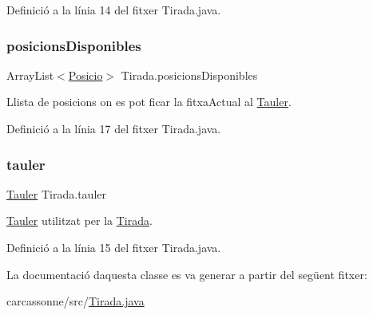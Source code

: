 Definició a la línia 14 del fitxer Tirada.\+java.

\mbox{\label{class_tirada_aaccd3106612026e374b9c2cb769aca12}} 
\subsubsection{\texorpdfstring{posicions\+Disponibles}{posicionsDisponibles}}
{\footnotesize\ttfamily Array\+List$<$\mbox{\hyperlink{class_posicio}{Posicio}}$>$ Tirada.\+posicions\+Disponibles\hspace{0.3cm}{\ttfamily [private]}}



Llista de posicions on es pot ficar la fitxa\+Actual al \mbox{\hyperlink{class_tauler}{Tauler}}. 



Definició a la línia 17 del fitxer Tirada.\+java.

\mbox{\label{class_tirada_a861054c4b90f8b27698610e0e3b5ad46}} 
\subsubsection{\texorpdfstring{tauler}{tauler}}
{\footnotesize\ttfamily \mbox{\hyperlink{class_tauler}{Tauler}} Tirada.\+tauler\hspace{0.3cm}{\ttfamily [private]}}



\mbox{\hyperlink{class_tauler}{Tauler}} utilitzat per la \mbox{\hyperlink{class_tirada}{Tirada}}. 



Definició a la línia 15 del fitxer Tirada.\+java.



La documentació d\textquotesingle{}aquesta classe es va generar a partir del següent fitxer\+:\begin{DoxyCompactItemize}
\item 
carcassonne/src/\mbox{\hyperlink{_tirada_8java}{Tirada.\+java}}\end{DoxyCompactItemize}
